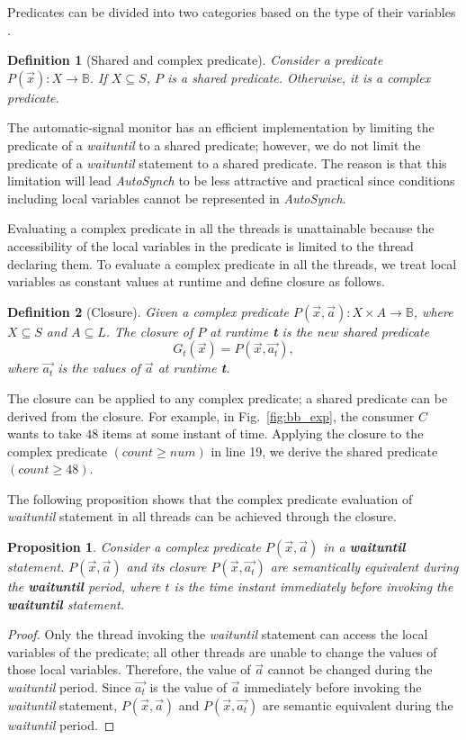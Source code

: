\documentclass{sigplanconf}
\newtheorem{definition}{Definition}
\newtheorem{proposition}{Proposition}
\begin{document}
Predicates can be divided into two categories based on the type of their 
variables \cite{bh05}.
\begin{definition}[Shared and complex predicate]
    Consider a predicate $P(\vec{x}): X \rightarrow \mathbb{B}$. If $X 
    \subseteq S$, $P$ 
    is a shared predicate. Otherwise, it
    is a complex predicate. 
\end{definition}

The automatic-signal monitor has an efficient implementation \cite{kes77} by 
limiting the predicate of a {\em waituntil} to a shared predicate; however, 
we do not limit the predicate of a {\em waituntil} statement to a shared
predicate. The reason is that this limitation will lead {\em AutoSynch} to be less
attractive and practical since conditions including local variables cannot be 
represented in {\em AutoSynch}.

Evaluating a complex predicate in all the threads is unattainable 
because the accessibility of the local variables in the predicate is limited 
to the thread declaring them. To evaluate a complex predicate in all the 
threads, we treat local variables as constant values at runtime and define 
closure as follows. 
\begin{definition}[Closure]
    Given a complex predicate $P(\vec{x}, \vec{a}): X \times A \rightarrow 
    \mathbb{B}$, where $X \subseteq S$ and $A \subseteq L$. The closure 
    of $P$ at runtime {\textbf t} is the new shared predicate
    \[
    G_t(\vec{x}) = P(\vec{x}, \vec{a_t}),
    \]
    where $\vec{a_t}$ is the values of $\vec{a}$ at runtime {\textbf t}. 
\end{definition}

The closure can be applied to any complex predicate; a shared 
predicate can be derived from the closure. For example, in
Fig.~\ref{fig:bb_exp}, the consumer $C$ wants to take $48$ items at some
instant of time. Applying the closure to the complex predicate $(count \ge num)$
in line 19, we derive the shared predicate $(count \ge 48)$.

The following proposition shows that the complex predicate evaluation of
{\em waituntil} statement in all threads can be achieved through the closure. 
\begin{proposition} \label{pro:glob}
    Consider a complex predicate $P(\vec{x}, \vec{a})$ in a \textbf
    {waituntil} 
    statement. $P(\vec{x}, \vec{a})$ and its closure 
    $P(\vec{x}, \vec{a_t})$ are semantically equivalent during the \textbf{waituntil} 
    period, where $t$ is the time instant immediately before invoking the 
    \textbf{waituntil} statement.  
\end{proposition}
\begin{proof}
    Only the thread invoking the {\em waituntil} statement can access the
    local variables of the predicate; all other threads are unable to change
    the values of those local variables. Therefore, the value of $\vec{a}$
    cannot be changed 
    during the {\em waituntil} period. Since $\vec{a_t}$ is the value of $\vec{a}$
    immediately before invoking the {\em waituntil} statement, $P(\vec{x}, \vec{a})$
    and $P(\vec{x}, \vec{a_t})$ are semantic equivalent during the {\em waituntil}
    period. 
\end{proof}
\end{document}
